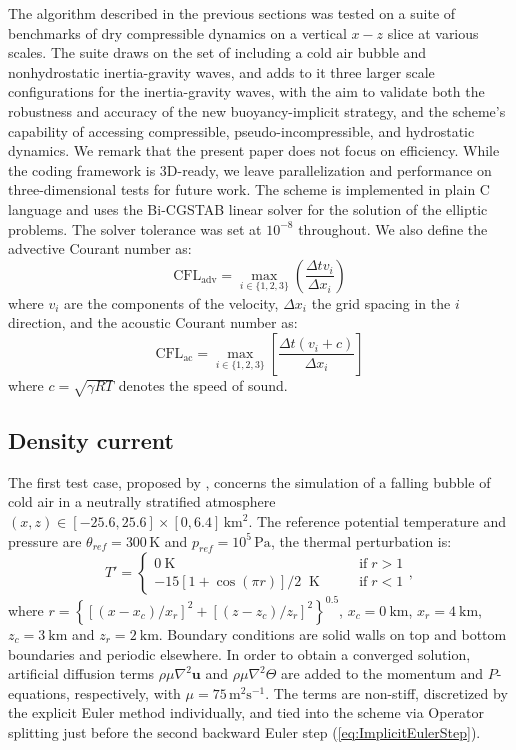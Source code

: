 \documentclass{ametsoc}
\theoremstyle{definition}
\newcommand{\eq}[1]{(\ref{#1})}
\newcommand{\dt}{\Delta t}
\newcommand{\dx}{{\Delta x}}
\begin{document}
The algorithm described in the previous sections was tested on a suite of benchmarks of dry compressible dynamics on a vertical $x-z$ slice at various scales. The suite draws on the set of \cite{Benacchio2014,BenacchioEtAl2014} including a cold air bubble and nonhydrostatic inertia-gravity waves, and adds to it three larger scale configurations for the inertia-gravity waves, with the aim to validate both the robustness and accuracy of the new buoyancy-implicit strategy, and the scheme's capability of accessing compressible, pseudo-incompressible, and hydrostatic dynamics. We remark that the present paper does not focus on efficiency. While the coding framework is 3D-ready, we leave parallelization and performance on three-dimensional tests for future work. The scheme is implemented in plain C language and uses the Bi-CGSTAB linear solver \citep{Vandervorst1992} for the solution of the elliptic problems. The solver tolerance was set at $10^{-8}$ throughout. We also define the advective Courant number as:
%
\begin{equation}
\textrm{CFL}_\textrm{adv} = \max\limits_{i \in \{1,2,3\}}\left(\frac{\dt v_i}{\dx_i}\right)
\end{equation}
%
where $v_i$ are the components of the velocity, $\dx_i$ the grid spacing in the $i$ direction, and the acoustic Courant number as:
%
\begin{equation}
\textrm{CFL}_\textrm{ac} = \max\limits_{i \in \{1,2,3\}}\left[\frac{\dt (v_i+c)}{\dx_i}\right]
\end{equation}
%
where $c=\sqrt{\gamma RT}$ denotes the speed of sound.

\subsection{Density current}

The first test case, proposed by \cite{StrakaEtAl1993}, concerns the simulation of a falling bubble of cold air in a neutrally stratified atmosphere $(x,z)\in[-25.6,25.6]\times[0,6.4]\,\textrm{km}^2$. The reference potential temperature and pressure  are $\theta_{ref}=300\,\textrm{K}$ and $p_{ref}=10^5\,\textrm{Pa}$, the thermal perturbation is:
%
\begin{equation}
 T'=\begin{cases}
           0~\textrm{K} \qquad&\textrm{if}\;r>1\\
	   -15\left[1+\cos(\pi r)\right]/2 \;\;\textrm{K}\qquad&\textrm{if}\;r<1   
          \end{cases},
\end{equation} 
%
where $r=\left\{[(x-x_c)/x_r]^2+[(z-z_c)/z_r]^2\right\}^{0.5}$, $x_c=0~\textrm{km}$, $x_r=4~\textrm{km}$, $z_c=3~\textrm{km}$ and $z_r=2~\textrm{km}$. 
%
Boundary conditions are solid walls on top and bottom boundaries and periodic elsewhere. In order to obtain a converged solution, artificial diffusion terms $\rho\mu\nabla^2\mathbf{u}$ and
$\rho\mu\nabla^2\Theta$ are added to the momentum and $P$-equations, respectively, with $\mu=75\,\textrm{m$^2$s$^{-1}$}$. The terms are non-stiff, discretized by the explicit Euler method individually, and tied into the scheme via Operator splitting just before the second backward
Euler step \eq{eq:ImplicitEulerStep}.
\end{document}
